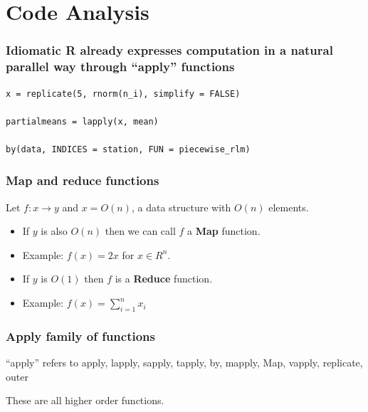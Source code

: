\documentclass{beamer}
\begin{document}
\section{Code Analysis}
\begin{frame}[fragile]

    \frametitle{Idiomatic R already expresses computation in a natural
    parallel way through ``apply'' functions}

\begin{verbatim}
x = replicate(5, rnorm(n_i), simplify = FALSE)

partialmeans = lapply(x, mean)

by(data, INDICES = station, FUN = piecewise_rlm)
\end{verbatim}

\end{frame}
\begin{frame}

    \frametitle{Map and reduce functions}

    Let $f: x \rightarrow y$ and $x = O(n)$, a data structure with $O(n)$
    elements.

    \begin{itemize}
        \item If $y$ is also $O(n)$ then we can call $f$ a \textbf{Map} function.

        \item Example: $f(x) = 2x$ for $x \in R^n$.

    
        \item If $y$ is $O(1)$ then $f$ is a \textbf{Reduce} function.

        \item Example: $f(x) = \sum_{i = 1}^n x_i$
    \end{itemize}

\end{frame}
\begin{frame}

    \frametitle{Apply family of functions}

    ``apply'' refers to apply, lapply, sapply, tapply, by, mapply, Map,
    vapply, replicate, outer

    These are all higher order functions.

    \end{frame}
\end{document}
